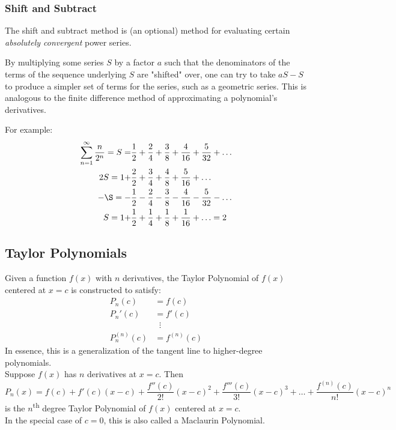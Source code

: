 \documentclass{article}
\begin{document}
\subsubsection{Shift and Subtract}
The shift and subtract method is (an optional) method for evaluating certain \emph{absolutely convergent} power series.

By multiplying some series $S$ by a factor $a$ such that the denominators of the terms of the sequence underlying $S$ are "shifted" over, one can try to take $aS - S$ to produce a simpler set of terms for the series, such as a geometric series. This is analogous to the finite difference method of approximating a polynomial's derivatives.

For example:
\begin{align*}
    \sum_{n=1}^\infty \frac{n}{2^n} = S = &\frac{1}{2} + \frac{2}{4} + \frac{3}{8} + \frac{4}{16} + \frac{5}{32} + \ldots \\
    2S = 1 + &\frac{2}{2} + \frac{3}{4} + \frac{4}{8} + \frac{5}{16} + \ldots \\
    -\S = -&\frac{1}{2} - \frac{2}{4} - \frac{3}{8} - \frac{4}{16} - \frac{5}{32} - \ldots  \\
    S = 1 + &\frac{1}{2} + \frac{1}{4} + \frac{1}{8} + \frac{1}{16} + \ldots = 2
\end{align*}

\subsection{Taylor Polynomials}
Given a function $f(x)$ with $n$ derivatives, the Taylor Polynomial of $f(x)$ centered at $x=c$ is constructed to satisfy:
\begin{align*}
    P_n(c)&=f(c)\\
    P_n'(c)&=f'(c)\\
    &\;\;\vdots\\
    P_n^{(n)}(c)&=f^{(n)}(c)
\end{align*}
In essence, this is a generalization of the tangent line to higher-degree polynomials.\\
Suppose $f(x)$ has $n$ derivatives at $x=c$. Then
$$P_n(x)=f(c)+f'(c)\left(x-c\right)+\frac{f''(c)}{2!}\left(x-c\right)^2+\frac{f'''(c)}{3!}\left(x-c\right)^3+\ldots+\frac{f^{(n)}(c)}{n!}\left(x-c\right)^n$$
is the $n$\textsuperscript{th} degree Taylor Polynomial of $f(x)$ centered at $x=c$.\\
In the special case of $c=0$, this is also called a Maclaurin Polynomial.
\end{document}
